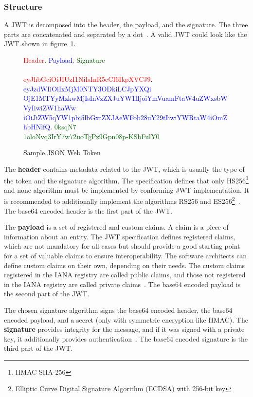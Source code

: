 \subsubsection{Structure}
A JWT is decomposed into the header, the payload, and the signature.
The three parts are concatenated and separated by a dot~\cite{jwtdocauth0}.
A valid JWT could look like the JWT shown in figure~\ref{fig:myjwt}.
\begin{figure}
    \textcolor{red}{Header}.
	\textcolor{blue}{Payload}.
	\textcolor{darkgreen}{Signature} \\ \\
    \textcolor{red}{eyJhbGciOiJIUzI1NiIsInR5cCI6IkpXVCJ9}.
	\textcolor{blue}{eyJzdWIiOiIxMjM0NTY3ODkiLCJpYXQi\\OjE1MTYyMzkwMjIsInVzZXJuYW1lIjoiYmVuamFtaW4uZWxsbWVyIiwiZW1haWw\\iOiJiZW5qYW1pbi5lbGxtZXJAeWFob28uY29tIiwiYWRtaW4iOmZhbHNlfQ}.
	\textcolor{darkgreen}{0ksqN7\\1oloNvq3IrY7w72uoTgPz9Gpn08p-KSbFulY0}
    \caption{Sample JSON Web Token}
    \label{fig:myjwt}
\end{figure}

The \textbf{header} contains metadata related to the JWT, which is usually the type of the token and the signature algorithm.
The specification defines that only HS256\footnote{HMAC SHA-256} and none algorithm must be implemented by conforming JWT implementation.
It is recommended to additionally implement the algorithms RS256 and ES256\footnote{Elliptic Curve Digital Signature Algorithm (ECDSA) with 256-bit key}~\cite{jwtdocauth0, jwtrfc}.
The base64 encoded header is the first part of the JWT.

The \textbf{payload} is a set of registered and custom claims.
A claim is a piece of information about an entity.
The JWT specification defines registered claims, which are not mandatory for all cases but should provide a good starting point for a set of valuable claims to ensure interoperability.
The software architects can define custom claims on their own, depending on their needs.
The custom claims registered in the IANA registry are called public claims, and those not registered in the IANA registry are called private claims~\cite{jwtdocauth0, jwtrfc}.
The base64 encoded payload is the second part of the JWT.

The chosen signature algorithm signs the base64 encoded header, the base64 encoded payload, and a secret (only with symmetric encryption like HMAC).
The \textbf{signature} provides integrity for the message, and if it was signed with a private key, it additionally provides authentication~\cite{jwtdocauth0}.
The base64 encoded signature is the third part of the JWT.

